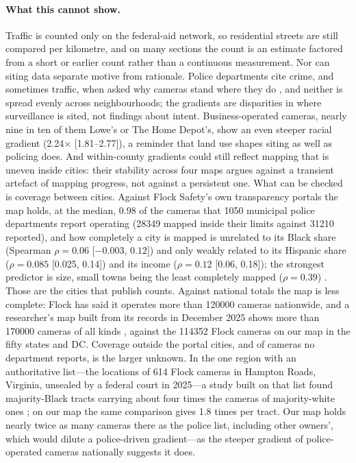 \documentclass[11pt,twoside]{article}
\begin{document}
\paragraph{What this cannot show.} Traffic is counted only on the federal-aid network, so
residential streets are still compared per kilometre, and on many sections the count is an
estimate factored from a short or earlier count rather than a continuous measurement. Nor can
siting data separate motive from rationale. Police departments cite crime, and sometimes
traffic, when asked why cameras stand where they do \citep{musgrave2023,witte2026}, and neither
is spread evenly across neighbourhoods; the gradients are disparities in where surveillance is
sited, not findings about intent. Business-operated cameras, nearly nine in ten of them Lowe's or
The Home Depot's, show an even steeper racial gradient (\num{2.24}$\times$ [1.81--2.77]), a
reminder that land use shapes siting as well as policing does. And within-county gradients could
still reflect mapping that is uneven inside cities: their stability across four maps argues
against a transient artefact of mapping progress, not against a persistent one. What can be
checked is coverage between cities. Against Flock Safety's own transparency portals the map
holds, at the median, \num{0.98} of the cameras that \num{1050} municipal police departments
report operating (\num{28349} mapped inside their limits against \num{31210} reported), and how
completely a city is mapped is unrelated to its Black share (Spearman $\rho=0.06$ [$-0.003$,
$0.12$]) and only weakly related to its Hispanic share ($\rho=0.085$ [0.025, 0.14]) and its
income ($\rho=0.12$ [0.06, 0.18]); the strongest predictor is size, small towns being the least
completely mapped ($\rho=0.39$) \citep{eyesonflock}. Those are the cities that publish counts.
Against national totals the map is less complete: Flock has said it operates more than
\num{120000} cameras nationwide, and a researcher's map built from its records in December 2025
shows more than \num{170000} cameras of all kinds \citep{mazurov2026}, against the \num{114352} Flock cameras on our map in the
fifty states and DC. Coverage outside the portal cities, and of cameras no department reports,
is the larger unknown.
In the one region with an authoritative list---the locations of 614 Flock cameras in Hampton
Roads, Virginia, unsealed by a federal court in 2025---a study built on that list found
majority-Black tracts carrying about four times the cameras of majority-white
ones \citep{keener2026}; on our map the same comparison gives
\num{1.8} times per tract. Our map holds nearly twice as many cameras there as the police list,
including other owners', which would dilute a police-driven gradient---as the steeper gradient of
police-operated cameras nationally suggests it does.
\end{document}
